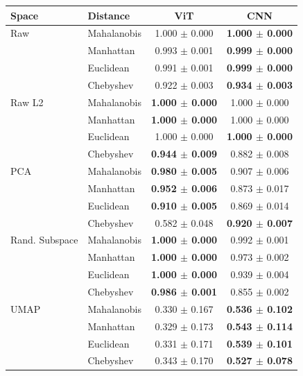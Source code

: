 \begin{tabular}{llcc}
\toprule
Space & Distance & ViT & CNN \\
\midrule
Raw & Mahalanobis & 1.000 $\pm$ 0.000 & \textbf{1.000 $\pm$ 0.000} \\
 & Manhattan & 0.993 $\pm$ 0.001 & \textbf{0.999 $\pm$ 0.000} \\
 & Euclidean & 0.991 $\pm$ 0.001 & \textbf{0.999 $\pm$ 0.000} \\
 & Chebyshev & 0.922 $\pm$ 0.003 & \textbf{0.934 $\pm$ 0.003} \\
\midrule
Raw L2 & Mahalanobis & \textbf{1.000 $\pm$ 0.000} & 1.000 $\pm$ 0.000 \\
 & Manhattan & \textbf{1.000 $\pm$ 0.000} & 1.000 $\pm$ 0.000 \\
 & Euclidean & 1.000 $\pm$ 0.000 & \textbf{1.000 $\pm$ 0.000} \\
 & Chebyshev & \textbf{0.944 $\pm$ 0.009} & 0.882 $\pm$ 0.008 \\
\midrule
PCA & Mahalanobis & \textbf{0.980 $\pm$ 0.005} & 0.907 $\pm$ 0.006 \\
 & Manhattan & \textbf{0.952 $\pm$ 0.006} & 0.873 $\pm$ 0.017 \\
 & Euclidean & \textbf{0.910 $\pm$ 0.005} & 0.869 $\pm$ 0.014 \\
 & Chebyshev & 0.582 $\pm$ 0.048 & \textbf{0.920 $\pm$ 0.007} \\
\midrule
Rand. Subspace & Mahalanobis & \textbf{1.000 $\pm$ 0.000} & 0.992 $\pm$ 0.001 \\
 & Manhattan & \textbf{1.000 $\pm$ 0.000} & 0.973 $\pm$ 0.002 \\
 & Euclidean & \textbf{1.000 $\pm$ 0.000} & 0.939 $\pm$ 0.004 \\
 & Chebyshev & \textbf{0.986 $\pm$ 0.001} & 0.855 $\pm$ 0.002 \\
\midrule
UMAP & Mahalanobis & 0.330 $\pm$ 0.167 & \textbf{0.536 $\pm$ 0.102} \\
 & Manhattan & 0.329 $\pm$ 0.173 & \textbf{0.543 $\pm$ 0.114} \\
 & Euclidean & 0.331 $\pm$ 0.171 & \textbf{0.539 $\pm$ 0.101} \\
 & Chebyshev & 0.343 $\pm$ 0.170 & \textbf{0.527 $\pm$ 0.078} \\

\bottomrule
\end{tabular}